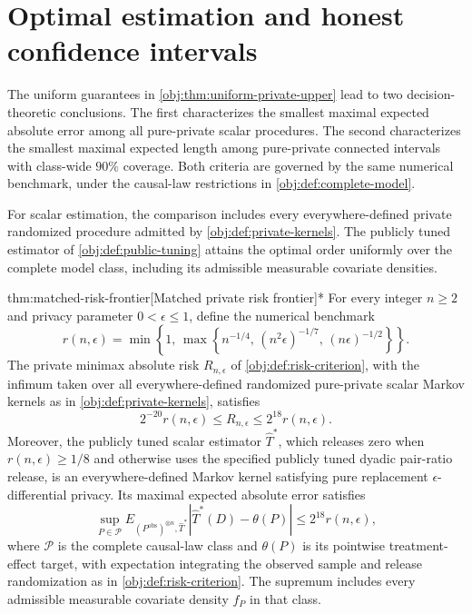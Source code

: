 \documentclass[11pt]{article}
\begin{document}
\section{Optimal estimation and honest confidence intervals}

The uniform guarantees in \cref{obj:thm:uniform-private-upper} lead to two decision-theoretic conclusions. The first characterizes the smallest maximal expected absolute error among all pure-private scalar procedures. The second characterizes the smallest maximal expected length among pure-private connected intervals with class-wide \(90\%\) coverage. Both criteria are governed by the same numerical benchmark, under the causal-law restrictions in \cref{obj:def:complete-model}.

For scalar estimation, the comparison includes every everywhere-defined private randomized procedure admitted by \cref{obj:def:private-kernels}. The publicly tuned estimator of \cref{obj:def:public-tuning} attains the optimal order uniformly over the complete model class, including its admissible measurable covariate densities.

\begin{theoremv}{thm:matched-risk-frontier}[Matched private risk frontier]*
For every integer \(n\ge2\) and privacy parameter \(0<\epsilon\le1\), define the numerical benchmark
\[
r(n,\epsilon)
=
\min\left\{1,\,
\max\left\{n^{-1/4},\,(n^2\epsilon)^{-1/7},\,(n\epsilon)^{-1/2}\right\}\right\}.
\]
The private minimax absolute risk \(R_{n,\epsilon}\) of \cref{obj:def:risk-criterion}, with the infimum taken over all everywhere-defined randomized pure-private scalar Markov kernels as in \cref{obj:def:private-kernels}, satisfies
\[
2^{-20}r(n,\epsilon)
\le R_{n,\epsilon}
\le 2^{18}r(n,\epsilon).
\]
Moreover, the publicly tuned scalar estimator \(\widehat T^*\), which releases zero when \(r(n,\epsilon)\ge1/8\) and otherwise uses the specified publicly tuned dyadic pair-ratio release, is an everywhere-defined Markov kernel satisfying pure replacement \(\epsilon\)-differential privacy. Its maximal expected absolute error satisfies
\[
\sup_{P\in\mathcal P}
E_{(P^{\mathrm{obs}})^{\otimes n},\widehat T^*}
\left|\widehat T^*(D)-\theta(P)\right|
\le 2^{18}r(n,\epsilon),
\]
where \(\mathcal P\) is the complete causal-law class and \(\theta(P)\) is its pointwise treatment-effect target, with expectation integrating the observed sample and release randomization as in \cref{obj:def:risk-criterion}. The supremum includes every admissible measurable covariate density \(f_P\) in that class.
\end{theoremv}
\end{document}
